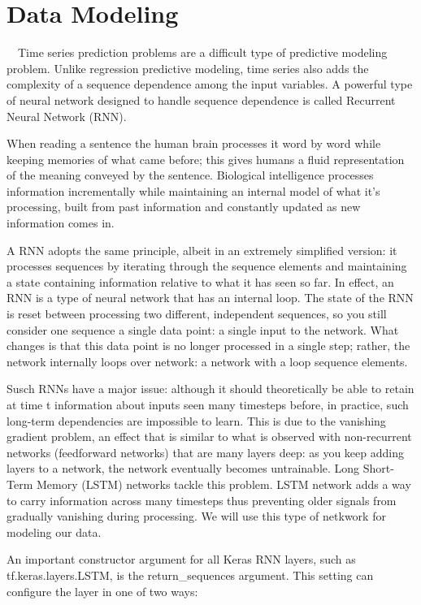 \section*{Data Modeling}\label{Data Modeling}

~~Time series prediction problems are a difficult type of predictive modeling problem. Unlike regression predictive modeling, time series also adds the complexity of a sequence dependence among the input variables. A powerful type of neural network designed to handle sequence dependence is called Recurrent Neural Network (RNN). 

When reading a sentence the human brain processes it word by word while keeping memories of what came before; this gives humans a fluid representation of the meaning conveyed by the sentence. Biological intelligence processes information incrementally while maintaining an internal model of what it’s processing, built from past information and constantly updated as new information comes in.

A RNN adopts the same principle, albeit in an extremely simplified version: it processes sequences by iterating through the sequence elements and maintaining a state containing information relative to what it has seen so far. In effect, an RNN is a type of neural network that has an internal loop. The state of the RNN is reset between processing two different, independent sequences, so you still consider one sequence a single data point: a single input to the network. What
changes is that this data point is no longer processed in a single step; rather, the network internally loops over network: a network with a loop sequence elements.

Susch RNNs have a major issue: although it should theoretically be able to retain at time t information about inputs seen many timesteps before, in practice, such long-term dependencies are impossible to learn. This is due to the vanishing gradient problem, an effect that is similar to what is observed with non-recurrent networks (feedforward networks) that are many layers deep: as you keep adding layers to a network, the network eventually becomes untrainable. Long Short-Term Memory (LSTM) networks tackle this problem. LSTM network adds a way to carry information across many timesteps thus preventing older signals from gradually vanishing during processing. We will use this type of netkwork for modeling our data.

An important constructor argument for all Keras RNN layers, such as tf.keras.layers.LSTM, is the return\_sequences argument. This setting can configure the layer in one of two ways:

